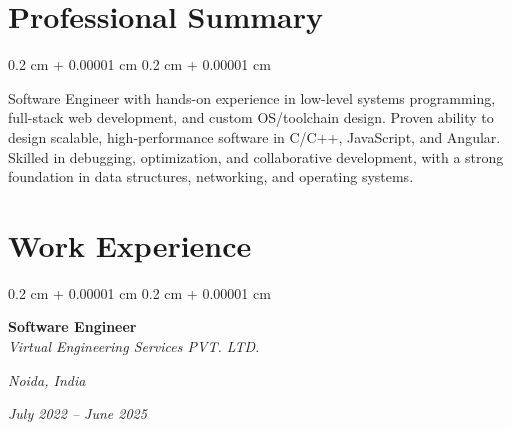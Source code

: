 \documentclass[10pt, letterpaper]{article}
\newenvironment{onecolentry}{
    \begin{adjustwidth}{
        0.2 cm + 0.00001 cm
    }{
        0.2 cm + 0.00001 cm
    }
}{
    \end{adjustwidth}
} %
\newenvironment{twocolentry}[2][]{
    \onecolentry
    \def\secondColumn{#2}
    \setcolumnwidth{\fill, 4.5 cm}
    \begin{paracol}{2}
}{
    \switchcolumn \raggedleft \secondColumn
    \end{paracol}
    \endonecolentry
} %
\begin{document}
    \section{Professional Summary}
    \begin{onecolentry}
        Software Engineer with hands-on experience in low-level systems programming, full-stack web development, and custom OS/toolchain design. Proven ability to design scalable, high-performance software in C/C++, JavaScript, and Angular. Skilled in debugging, optimization, and collaborative development, with a strong foundation in data structures, networking, and operating systems.
    \end{onecolentry}

    \section{Work Experience}

    \vspace{0.2 cm}

        \begin{twocolentry}{
        \textit{Noida, India}    

        \textit{July 2022 – June 2025}}
            \textbf{Software Engineer} \\
            \textit{Virtual Engineering Services PVT. LTD.}
        \end{twocolentry}
\end{document}
